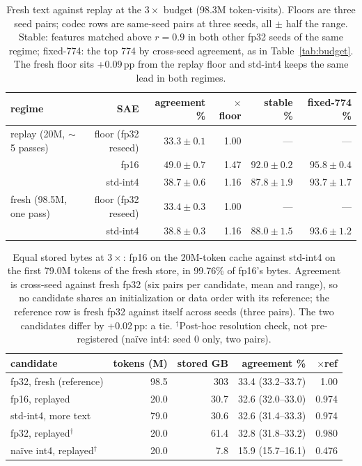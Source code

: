 \begin{table}[htbp]
\caption{Fresh text against replay at the $3\times$ budget (98.3M token-visits). Floors are three seed pairs; codec rows are same-seed pairs at three seeds, all $\pm$ half the range. Stable: features matched above $r = 0.9$ in both other fp32 seeds of the same regime; fixed-774: the top 774 by cross-seed agreement, as in Table~\ref{tab:budget}. The fresh floor sits +0.09\,pp from the replay floor and std-int4 keeps the same lead in both regimes.}
\label{tab:fresh}
\centering\small
\begin{tabular}{lrrrrr}
\toprule
regime & SAE & agreement \% & $\times$floor & stable \% & fixed-774 \% \\
\midrule
replay (20M, $\sim$5 passes) & floor (fp32 reseed) & $33.3 \pm 0.1$ & 1.00 & --- & --- \\
 & fp16 & $49.0 \pm 0.7$ & 1.47 & $92.0 \pm 0.2$ & $95.8 \pm 0.4$ \\
 & std-int4 & $38.7 \pm 0.6$ & 1.16 & $87.8 \pm 1.9$ & $93.7 \pm 1.7$ \\
\midrule
fresh (98.5M, one pass) & floor (fp32 reseed) & $33.4 \pm 0.3$ & 1.00 & --- & --- \\
 & std-int4 & $38.8 \pm 0.3$ & 1.16 & $88.0 \pm 1.5$ & $93.6 \pm 1.2$ \\
\bottomrule
\end{tabular}
\end{table}

\begin{table}[htbp]
\caption{Equal stored bytes at $3\times$: fp16 on the 20M-token cache against std-int4 on the first 79.0M tokens of the fresh store, in 99.76\% of fp16's bytes. Agreement is cross-seed against fresh fp32 (six pairs per candidate, mean and range), so no candidate shares an initialization or data order with its reference; the reference row is fresh fp32 against itself across seeds (three pairs). The two candidates differ by +0.02\,pp: a tie. $^\dagger$Post-hoc resolution check, not pre-registered (na\"ive int4: seed 0 only, two pairs).}
\label{tab:equalbytes}
\centering\small
\begin{tabular}{lrrrr}
\toprule
candidate & tokens (M) & stored GB & agreement \% & $\times$ref \\
\midrule
fp32, fresh (reference) & 98.5 & 303 & 33.4 (33.2--33.7) & 1.00 \\
fp16, replayed & 20.0 & 30.7 & 32.6 (32.0--33.0) & 0.974 \\
std-int4, more text & 79.0 & 30.6 & 32.6 (31.4--33.3) & 0.974 \\
\midrule
fp32, replayed$^\dagger$ & 20.0 & 61.4 & 32.8 (31.8--33.2) & 0.980 \\
na\"ive int4, replayed$^\dagger$ & 20.0 & 7.8 & 15.9 (15.7--16.1) & 0.476 \\
\bottomrule
\end{tabular}
\end{table}

